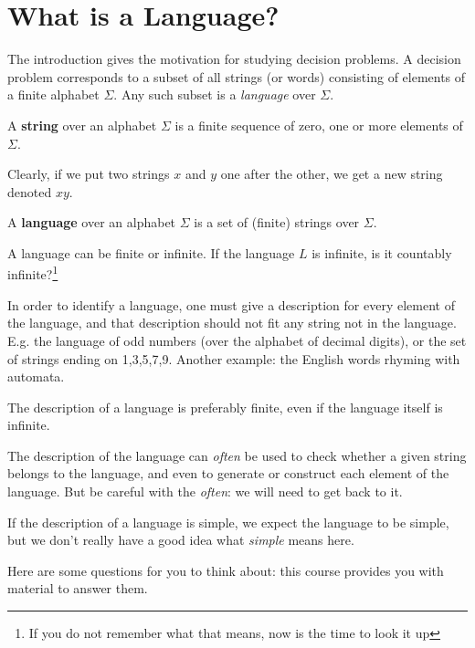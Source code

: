 \section{What is a Language?}

The introduction gives the motivation for studying decision
problems. A decision problem corresponds to a subset of all strings
(or words) consisting of elements of a finite alphabet $\Sigma$. Any
such subset is a {\em language} over $\Sigma$.

\begin{definition}
A {\bf string} over an alphabet $\Sigma$ is a finite sequence of zero,
one or more elements of $\Sigma$.
\end{definition}

Clearly, if we put two strings $x$ and $y$ one after the other, we get
a new string denoted $xy$.

\begin{definition}
A {\bf language} over an alphabet $\Sigma$ is a set of (finite)
strings over $\Sigma$.
\end{definition}

A language can be finite or infinite. If the language $L$ is infinite,
is it countably infinite?\footnote{If you do not remember what that
means, now is the time to look it up}

In order to identify a language, one must give a description for every
element of the language, and that description should not fit any
string not in the language. E.g. the language of odd numbers (over the
alphabet of decimal digits), or the set of strings ending on
1,3,5,7,9. Another example: the English words rhyming with automata.

The description of a language is preferably finite, even if the
language itself is infinite.

The description of the language can {\em often} be used to check whether a
given string belongs to the language, and even to generate or
construct each element of the language. But be careful with the {\em
often}: we will need to get back to it.

If the description of a language is simple, we expect the language to
be simple, but we don't really have a good idea what {\em simple}
means here.

Here are some questions for you to think about: this course provides
you with material to answer them.

